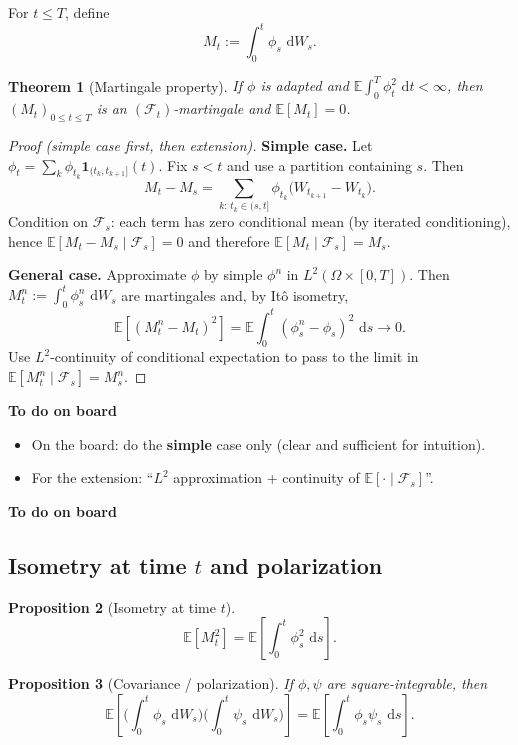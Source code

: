 \documentclass[11pt]{article}
\newcommand{\E}{\mathbb{E}}
\newcommand{\F}{\mathcal{F}}
\newcommand{\1}{\mathbf{1}}
\newcommand{\dd}{\,\mathrm{d}}
\numberwithin{equation}{section}
\theoremstyle{plain}
\newtheorem{theorem}{Theorem}[section]
\newtheorem{proposition}[theorem]{Proposition}
\theoremstyle{definition}
\theoremstyle{remark}
\begin{document}
For $t\le T$, define
\[
M_t := \int_0^t \phi_s\,\dd W_s.
\]

\begin{theorem}[Martingale property]
If $\phi$ is adapted and $\E\!\int_0^T \phi_t^2\,\dd t<\infty$, then $(M_t)_{0\le t\le T}$
is an $(\F_t)$-martingale and $\E[M_t]=0$.
\end{theorem}

\begin{proof}[Proof (simple case first, then extension)]
\textbf{Simple case.} Let $\phi_t=\sum_k \phi_{t_k}\1_{(t_k,t_{k+1}]}(t)$.
Fix $s<t$ and use a partition containing $s$. Then
\[
M_t-M_s=\sum_{k:\,t_k\in(s,t]} \phi_{t_k}\big(W_{t_{k+1}}-W_{t_k}\big).
\]
Condition on $\F_s$: each term has zero conditional mean (by iterated conditioning), hence
$\E[M_t-M_s\mid\F_s]=0$ and therefore $\E[M_t\mid\F_s]=M_s$.

\textbf{General case.} Approximate $\phi$ by simple $\phi^n$ in $L^2(\Omega\times[0,T])$.
Then $M_t^n:=\int_0^t \phi_s^n\,\dd W_s$ are martingales and, by It\^o isometry,
\[
\E[(M_t^n-M_t)^2]=\E\!\int_0^t(\phi_s^n-\phi_s)^2\,\dd s\to 0.
\]
Use $L^2$-continuity of conditional expectation to pass to the limit in
$\E[M_t^n\mid\F_s]=M_s^n$.
\end{proof}

\textbf{To do on board}
\begin{itemize}
  \item On the board: do the \textbf{simple} case only (clear and sufficient for intuition).
  \item For the extension: ``$L^2$ approximation + continuity of $\E[\cdot\mid\F_s]$''.
\end{itemize}
\textbf{To do on board}

\subsection{Isometry at time $t$ and polarization}

\begin{proposition}[Isometry at time $t$]
\[
\E[M_t^2]=\E\!\left[\int_0^t \phi_s^2\,\dd s\right].
\]
\end{proposition}

\begin{proposition}[Covariance / polarization]
If $\phi,\psi$ are square-integrable, then
\[
\E\!\left[\Big(\int_0^t \phi_s\,\dd W_s\Big)\Big(\int_0^t \psi_s\,\dd W_s\Big)\right]
=\E\!\left[\int_0^t \phi_s\psi_s\,\dd s\right].
\]
\end{proposition}
\end{document}
